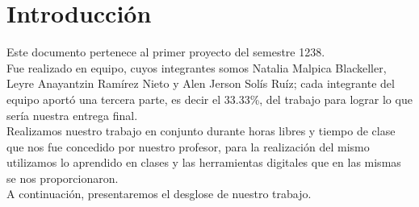 \documentclass{article}
\begin{document}
\pagebreak
\section{Introducción}
\normalsize Este documento pertenece al primer proyecto del semestre 1238.\\ Fue realizado en equipo, cuyos integrantes somos Natalia Malpica Blackeller, Leyre Anayantzin Ramírez Nieto y Alen Jerson Solís Ruíz; cada integrante del equipo aportó una tercera parte, es decir el 33.33\%, del trabajo para lograr lo que sería nuestra entrega final.\\ Realizamos nuestro trabajo en conjunto durante horas libres y tiempo de clase que nos fue concedido por nuestro profesor, para la realización del mismo utilizamos lo aprendido en clases y las herramientas digitales que en las mismas se nos proporcionaron.\\ A continuación, presentaremos el desglose de nuestro trabajo.

\pagebreak
\end{document}
